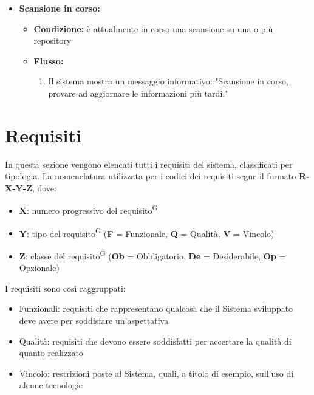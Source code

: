 \documentclass[a4paper, 11pt]{article}
\begin{document}
\begin{itemize}
\begin{itemize}
\begin{itemize}
\begin{enumerate}
				\end{enumerate}
			\end{itemize}
		\item \textbf{Scansione in corso:}
			\begin{itemize}
				\item \textbf{Condizione:} è attualmente in corso una scansione su una o più repository
				\item \textbf{Flusso:}
				\begin{enumerate}
					\item Il sistema mostra un messaggio informativo: "Scansione in corso, provare ad aggiornare le informazioni più tardi."
				\end{enumerate}
			\end{itemize}
	\end{itemize}
\end{itemize}






\newpage
\section{Requisiti} \label{sec:requisiti}

In questa sezione vengono elencati tutti i requisiti del sistema, classificati per tipologia.
La nomenclatura utilizzata per i codici dei requisiti segue il formato \textbf{R-X-Y-Z}, dove:
\begin{itemize}
    \item \textbf{X}: numero progressivo del requisito\textsuperscript{G}
    \item \textbf{Y}: tipo del requisito\textsuperscript{G} (\textbf{F} = Funzionale, \textbf{Q} = Qualità, \textbf{V} = Vincolo)
    \item \textbf{Z}: classe del requisito\textsuperscript{G} (\textbf{Ob} = Obbligatorio, \textbf{De} = Desiderabile, \textbf{Op} = Opzionale)
\end{itemize}

I requisiti sono così raggruppati:
\begin{itemize}
    \item Funzionali: requisiti che rappresentano qualcosa che il Sistema sviluppato deve
avere per soddisfare un’aspettativa
    \item Qualità: requisiti che devono essere soddisfatti per accertare la qualità di
quanto realizzato
    \item Vincolo: restrizioni poste al Sistema, quali, a titolo di esempio, sull’uso di alcune
tecnologie
\end{itemize}
\end{document}
